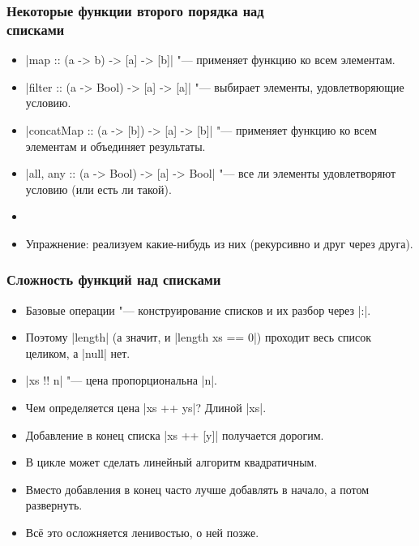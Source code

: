 \documentclass[11pt]{beamer}
\begin{document}
\begin{frame}[fragile]
  \frametitle{Некоторые функции второго порядка над\\ списками}
  \begin{itemize}
    \item \haskinline|map :: (a -> b) -> [a] -> [b]| \pause"--- применяет функцию ко всем элементам.
    \item \haskinline|filter :: (a -> Bool) -> [a] -> [a]| \pause"--- выбирает элементы, удовлетворяющие условию.
    \item \haskinline|concatMap :: (a -> [b]) -> [a] -> [b]| \pause"--- применяет функцию ко всем элементам и объединяет результаты.
    \item \haskinline|all, any :: (a -> Bool) -> [a] -> Bool| \pause"--- все ли элементы удовлетворяют условию (или есть ли такой).
          \pause
    \item[]
    \item Упражнение: реализуем какие-нибудь из них (рекурсивно и друг через друга).
  \end{itemize}
\end{frame}

\begin{frame}[fragile]
  \frametitle{Сложность функций над списками}
  \begin{itemize}
    \item Базовые операции "--- конструирование списков и их разбор через \haskinline|:|.
          \pause
    \item Поэтому \haskinline|length| (а значит, и \haskinline|length xs == 0|) проходит весь список целиком, а \haskinline|null| нет.
          \pause
    \item \haskinline[escapeinside=``]|xs !! n| "--- цена пропорциональна \pause\haskinline|n|.
          \pause
    \item Чем определяется цена \haskinline|xs ++ ys|? \pause Длиной \haskinline|xs|.
          \pause
    \item Добавление в конец списка \haskinline|xs ++ [y]| получается дорогим.
    \item В цикле может сделать линейный алгоритм квадратичным.
          \pause
    \item Вместо добавления в конец часто лучше добавлять в начало, а потом развернуть.
          \pause
    \item Всё это осложняется ленивостью, о ней позже.
  \end{itemize}
\end{frame}
\end{document}
